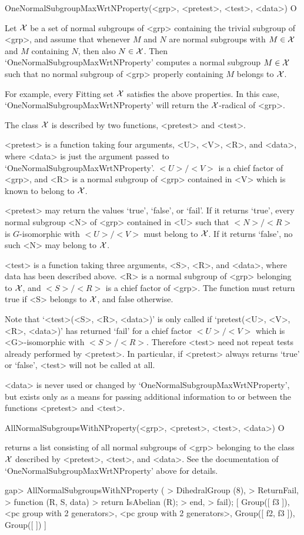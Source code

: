 
\>OneNormalSubgroupMaxWrtNProperty(<grp>, <pretest>, <test>, <data>) O

Let $\cal X$ be a set of normal subgroups of <grp> containing the trivial
subgroup of <grp>, and assume that whenever
$M$ and $N$ are normal subgroups with $M \in \cal X$ and $M$
containing $N$, then also $N \in \cal X$. Then
`OneNormalSubgroupMaxWrtNProperty' computes a normal subgroup $M \in \cal X$
such that no normal subgroup of <grp> properly containing $M$ belongs to $\cal
X$. 

For example, every Fitting set $\cal X$ satisfies the above properties. In
this case, `OneNormalSubgroupMaxWrtNProperty' will return the $\cal
X$-radical of <grp>.

The class $\cal X$ is described by two functions, <pretest> and <test>. 

<pretest> is a function taking four arguments, <U>, <V>, <R>, and <data>,
where <data> is just the argument passed to
`OneNormalSubgroupMaxWrtNProperty'. $<U>/<V>$ is a chief factor of <grp>,
and  <R> is a normal subgroup of <grp> contained in <V> which is known to
belong to
$\cal X$.

<pretest> may return the values `true', `false', or `fail'. If it returns 
`true', every normal subgroup <N> of <grp> contained in <U> such that
$<N>/<R>$ is 
$G$-isomorphic with $<U>/<V>$ must belong to $\cal X$. If it returns `false',
no such <N> may belong to $\cal X$. 

<test> is a function taking three arguments, <S>, <R>, and <data>, where
data has been described above. <R> is a normal subgroup of <grp> belonging to
$\cal X$, and $<S>/<R>$ is a chief factor of <grp>. The function must return
true if <S> belongs to $\cal X$, and false otherwise. 

Note that `<test>(<S>, <R>, <data>)' is only called if `pretest(<U>, <V>,
<R>, <data>)' has returned `fail' for a chief factor $<U>/<V>$ which is
<G>-isomorphic with $<S>/<R>$. Therefore <test> need not repeat tests
already performed by <pretest>. In particular, if <pretest> always returns
`true' or `false', <test> will not be called at all.

<data> is never used or changed by `OneNormalSubgroupMaxWrtNProperty', but
exists only as a means for passing additional information to or between
the functions <pretest> and <test>.


\>AllNormalSubgroupsWithNProperty(<grp>, <pretest>, <test>, <data>) O

returns a list consisting of all normal subgroups of <grp> belonging 
to the class $\cal X$ described by <pretest>, <test>, and <data>. See
the documentation of `OneNormalSubgroupMaxWrtNProperty' above for details.

\beginexample
gap> AllNormalSubgroupsWithNProperty (
> DihedralGroup (8),
>     ReturnFail,
>     function (R, S, data)
>         return IsAbelian (R);
>     end,
>     fail);
[ Group([ f3 ]), <pc group with 2 generators>, <pc group with 2 generators>,
  Group([ f2, f3 ]), Group([  ]) ]
\endexample

